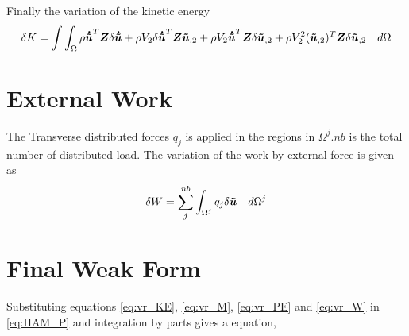 \documentclass[main.tex]{subfiles}
\begin{document}
Finally the variation of the kinetic energy
\begin{equation}\label{eq:vr_KE}
\delta K
= 
\int \int_\Omega
\rho  \boldsymbol{\dot{\tilde{u}}}^T  \boldsymbol{Z}    \delta \boldsymbol{\dot{\tilde{u}}}
+
\rho  V_2 \delta \boldsymbol{\dot{\tilde{u}}}^T  \boldsymbol{Z}      \boldsymbol{\tilde{u}}_{,2}
+
\rho  V_2 \boldsymbol{\dot{\tilde{u}}}^T  \boldsymbol{Z}     \delta \boldsymbol{\tilde{u}}_{,2}
+ 
\rho  V_2^2 (\boldsymbol{\tilde{u}}_{,2})^T   \boldsymbol{Z}      \delta \boldsymbol{\tilde{u}}_{,2}
\quad
 d\Omega
\end{equation}



\section{External Work}
The Transverse distributed forces $q_j$ is applied in the regions in $\Omega^j$.$nb$ is the total number of distributed load. The variation of the work by external force is given as
\begin{equation}\label{eq:vr_W}
\delta W=\sum_j^{nb} \int_{\Omega^j} q_j \delta \boldsymbol{\tilde{u}} \quad  d \Omega^j
\end{equation}

\section{Final Weak Form}
Substituting equations  \ref{eq:vr_KE}, \ref{eq:vr_M}, \ref{eq:vr_PE} and \ref{eq:vr_W} in \ref{eq:HAM_P} and integration by parts gives a equation,
\end{document}
